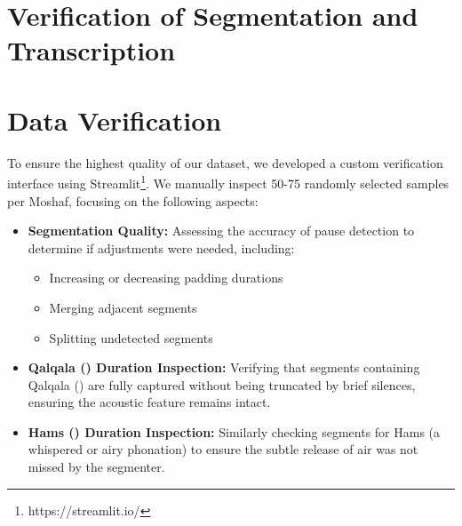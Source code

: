 




\section{Verification of Segmentation and Transcription}
\section{Data Verification}

To ensure the highest quality of our dataset, we developed a custom verification interface using Streamlit\footnote{https://streamlit.io/}. We manually inspect 50-75 randomly selected samples per Moshaf, focusing on the following aspects:

\begin{itemize}
\item \textbf{Segmentation Quality:} Assessing the accuracy of pause detection to determine if adjustments were needed, including:
\begin{itemize}
    \item Increasing or decreasing padding durations
    \item Merging adjacent segments
    \item Splitting undetected segments
\end{itemize}
\item \textbf{Qalqala () Duration Inspection:} Verifying that segments containing Qalqala () are fully captured without being truncated by brief silences, ensuring the acoustic feature remains intact.
\item \textbf{Hams () Duration Inspection:} Similarly checking segments for Hams (a whispered or airy phonation) to ensure the subtle release of air was not missed by the segmenter.
\end{itemize}

